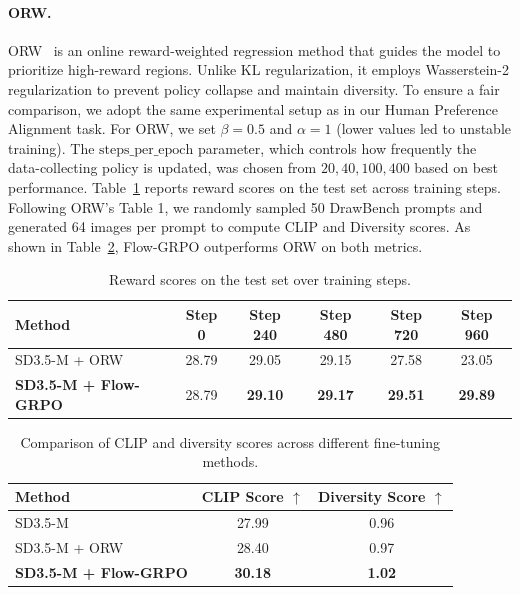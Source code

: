 \paragraph{ORW.}
ORW~\cite{fan2025online} is an online reward-weighted regression method that guides the model to prioritize high-reward regions. Unlike KL regularization, it employs Wasserstein-2 regularization to prevent policy collapse and maintain diversity.
To ensure a fair comparison, we adopt the same experimental setup as in our Human Preference Alignment task.
For ORW, we set $\beta = 0.5$ and $\alpha = 1$ (lower values led to unstable training). The $\text{steps\_per\_epoch}$ parameter, which controls how frequently the data-collecting policy is updated, was chosen from ${20, 40, 100, 400}$ based on best performance.
Table~\ref{tab:sd35_flowgrpo_orw} reports reward scores on the test set across training steps.
Following ORW’s Table 1, we randomly sampled 50 DrawBench prompts and generated 64 images per prompt to compute CLIP and Diversity scores.
As shown in Table~\ref{tab:clip_diversity_scores}, Flow-GRPO outperforms ORW on both metrics.

\begin{table}[h]
\centering
\small
\caption{Reward scores on the test set over training steps.}
\begin{tabular}{lccccc}
\toprule
\textbf{Method} & \textbf{Step 0} & \textbf{Step 240} & \textbf{Step 480} & \textbf{Step 720} & \textbf{Step 960} \\
\midrule
SD3.5-M + ORW & 28.79 & 29.05 & 29.15 & 27.58 & 23.05 \\
\textbf{SD3.5-M + Flow-GRPO} & 28.79 & \textbf{29.10} & \textbf{29.17} & \textbf{29.51} & \textbf{29.89} \\
\bottomrule
\end{tabular}
\label{tab:sd35_flowgrpo_orw}
\end{table}

\begin{table}[h]
\centering
\small
\setlength{\tabcolsep}{24pt}
\caption{Comparison of CLIP and diversity scores across different fine-tuning methods.}
\begin{tabular}{lcc}
\toprule
\textbf{Method} & \textbf{CLIP Score} $\uparrow$ & \textbf{Diversity Score} $\uparrow$ \\
\midrule
SD3.5-M & 27.99 & 0.96 \\
SD3.5-M + ORW & 28.40 & 0.97 \\
\textbf{SD3.5-M + Flow-GRPO} & \textbf{30.18} & \textbf{1.02} \\
\bottomrule
\end{tabular}
\label{tab:clip_diversity_scores}
\end{table}



